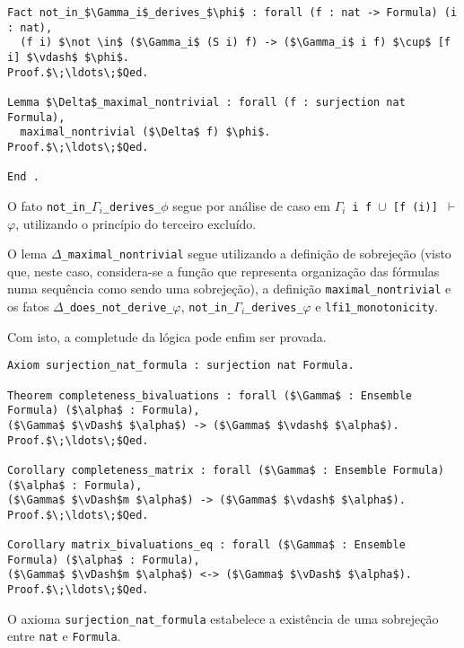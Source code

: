         \begin{lstlisting}[name=Completeness, frame=single, language=coq]
Fact not_in_$\Gamma_i$_derives_$\phi$ : forall (f : nat -> Formula) (i : nat),
  (f i) $\not \in$ ($\Gamma_i$ (S i) f) -> ($\Gamma_i$ i f) $\cup$ [f i] $\vdash$ $\phi$.
Proof.$\;\ldots\;$Qed.

Lemma $\Delta$_maximal_nontrivial : forall (f : surjection nat Formula),
  maximal_nontrivial ($\Delta$ f) $\phi$.
Proof.$\;\ldots\;$Qed.

End .
        \end{lstlisting}

        O fato \texttt{not\_in\_$\Gamma_i$\_derives\_$\phi$} segue por análise de caso em \texttt{$\Gamma_i$\ i\ f $\cup$ [f (i)] $\vdash$ $\varphi$}, utilizando o princípio do terceiro excluído.
        
        O lema \texttt{$\Delta$\_maximal\_nontrivial} segue utilizando a definição de sobrejeção (visto que, neste caso, considera-se a função que representa organização das fórmulas numa sequência como sendo uma sobrejeção), a definição \texttt{maximal\_nontrivial} e os fatos \texttt{$\Delta$\_does\_not\_derive\_$\varphi$}, \texttt{not\_in\_$\Gamma_i$\_derives\_$\varphi$} e \texttt{lfi1\_monotonicity}.

        Com isto, a completude da lógica \lfium{} pode enfim ser provada.

        \begin{lstlisting}[name=Completeness, frame=single, language=coq]
Axiom surjection_nat_formula : surjection nat Formula.

Theorem completeness_bivaluations : forall ($\Gamma$ : Ensemble Formula) ($\alpha$ : Formula), 
($\Gamma$ $\vDash$ $\alpha$) -> ($\Gamma$ $\vdash$ $\alpha$).
Proof.$\;\ldots\;$Qed.
  
Corollary completeness_matrix : forall ($\Gamma$ : Ensemble Formula) ($\alpha$ : Formula), 
($\Gamma$ $\vDash$m $\alpha$) -> ($\Gamma$ $\vdash$ $\alpha$).
Proof.$\;\ldots\;$Qed.

Corollary matrix_bivaluations_eq : forall ($\Gamma$ : Ensemble Formula) ($\alpha$ : Formula),
($\Gamma$ $\vDash$m $\alpha$) <-> ($\Gamma$ $\vDash$ $\alpha$).
Proof.$\;\ldots\;$Qed.
        \end{lstlisting}

        O axioma \texttt{surjection\_nat\_formula} estabelece a existência de uma sobrejeção entre \texttt{nat} e \texttt{Formula}.

